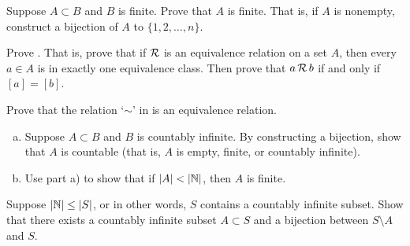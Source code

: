 \begin{exercise}
Suppose $A \subset B$ and $B$ is finite. Prove that $A$ is finite.
That is, if $A$ is nonempty, construct a bijection of $A$ to $\{ 1,2,\ldots,n \}$.
\end{exercise}

\begin{exercise}
Prove .  That is, prove that if ${\mathcal{R}}$ is an
equivalence relation on a set $A$, then every $a \in A$ is in exactly one
equivalence class.  Then prove that $a \, {\mathcal{R}} \, b$ if and only if $[a] =
[b]$.
\end{exercise}

\begin{exercise}
Prove that the relation `$\sim$'
in  is an equivalence
relation.
\end{exercise}

\begin{exercise}
\leavevmode
\begin{enumerate}[a)]
\item
Suppose $A \subset B$ and $B$ is countably infinite.  By constructing a
bijection, show that $A$ is
countable (that is, $A$ is empty, finite, or countably infinite).
\item 
Use part a) to show that if $\left\lvert {A} \right\rvert < \left\lvert {{\mathbb{N}}} \right\rvert$, then $A$ is finite.
\end{enumerate}
\end{exercise}

\begin{exercise}[Challenging] \label{exercise:countsubsetbij}
Suppose $\left\lvert {{\mathbb{N}}} \right\rvert \leq \left\lvert {S} \right\rvert$, or in other words, $S$
contains a countably infinite subset.
Show that there exists a countably infinite subset $A \subset S$ and
a bijection between $S \setminus A$ and $S$.
\end{exercise}
